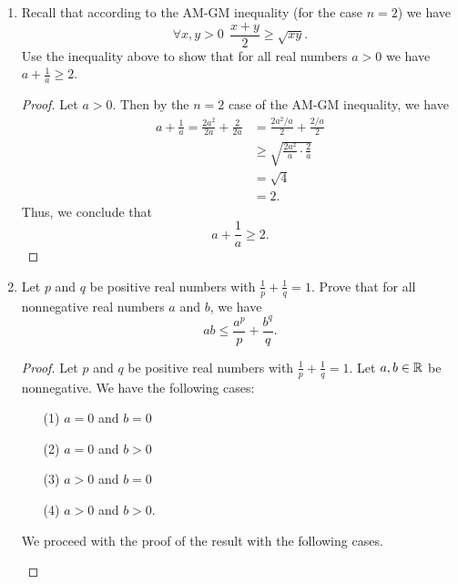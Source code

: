 \documentclass{article}
\begin{document}
\begin{enumerate}
            \item Recall that according to the AM-GM inequality (for the case \( n = 2  \)) we have 
                \[ \forall x,y > 0 \ \ \frac{ x + y  }{  2  }  \geq \sqrt{ xy }.  \]
                Use the inequality above to show that for all real numbers \( a > 0  \) we have \( a + \frac{ 1 }{ a }  \geq 2  \).
                \begin{proof}
                Let \( a > 0  \). Then by the \( n = 2  \) case of the AM-GM inequality, we have
                \begin{align*}
                a + \frac{ 1 }{ a  } = \frac{ 2 a^{2} }{ 2a  }  + \frac{ 2  }{ 2a  }  &= \frac{ 2a^{2}/ a  }{ 2  }  + \frac{ 2 /a  }{ 2  } \\
                                                                                      &\geq \sqrt{ \frac{ 2 a^{2} }{ a }  \cdot \frac{ 2 }{ a }  } \\ 
                                                                                      &= \sqrt{ 4 } \\
                                                                                      &=2.
            \end{align*}
            Thus, we conclude that 
            \[ a + \frac{ 1 }{ a }  \geq 2. \]
             \end{proof}
        \item Let \( p  \) and \( q  \) be positive real numbers with \( \frac{ 1 }{ p }  + \frac{ 1 }{ q } = 1  \). Prove that for all nonnegative real numbers \(  a \) and \( b  \), we have
            \[  ab \leq \frac{ a^{p} }{ p }  + \frac{ b^{q} }{ q }. \]
            \begin{proof}
            Let \( p  \) and \( q  \) be positive real numbers with \( \frac{ 1 }{ p }  + \frac{ 1 }{ q }  = 1  \). Let \( a,b \in \mathbb{R}  \) be nonnegative. We have the following cases:  
            \begin{enumerate}
                \item[(1)] \( a = 0  \) and \( b = 0  \)
                \item[(2)] \( a = 0  \) and \( b > 0  \)
                \item[(3)] \( a > 0  \) and \( b = 0  \)
                \item[(4)] \( a > 0  \) and \( b > 0  \).
            \end{enumerate}
            We proceed with the proof of the result with the following cases.
            \begin{enumerate}

\end{enumerate}
\end{proof}
\end{enumerate}
\end{document}
